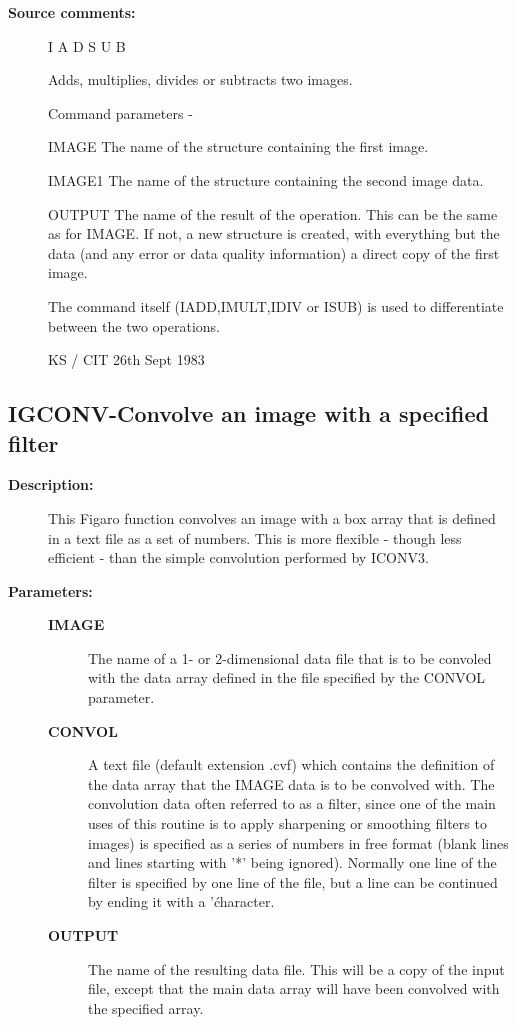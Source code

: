 \begin{description}
\begin{description}
\item [\textbf{Source comments:}]
\begin{terminalv}
 I A D S U B

 Adds, multiplies, divides or subtracts two images.

 Command parameters -

 IMAGE  The name of the structure containing the first image.

 IMAGE1 The name of the structure containing the second
        image data.

 OUTPUT The name of the result of the operation.  This can
        be the same as for IMAGE.  If not, a new structure
        is created, with everything but the data (and any error
        or data quality information) a direct copy of the first
        image.

 The command itself (IADD,IMULT,IDIV or ISUB) is used to
 differentiate between the two operations.

                                  KS / CIT 26th Sept 1983
\end{terminalv}
\end{description}
\subsection{IGCONV-\label{IGCONV}Convolve an image with a specified filter}
\begin{description}

\item [\textbf{Description:}]
 This Figaro function convolves an image with a box array that
 is defined in a text file as a set of numbers.  This is more
 flexible - though less efficient - than the simple convolution
 performed by ICONV3.

\item [\textbf{Parameters:}]
\begin{description}
\item [\textbf{IMAGE}]
 The name of a 1- or 2-dimensional data file that
 is to be convoled with the data array defined
 in the file specified by the CONVOL parameter.
\item [\textbf{CONVOL}]
 A text file (default extension .cvf)
 which contains the definition of the data array that the
 IMAGE data is to be convolved with. The convolution data
 often referred to as a filter, since one of the main uses
 of this routine is to apply sharpening or smoothing filters
 to images) is specified as a series of numbers in free
 format (blank lines and lines starting with '*' being
 ignored). Normally one line of the filter is specified by
 one line of the file, but a line can be continued by
 ending it with a '\' character.
\item [\textbf{OUTPUT}]
 The name of the resulting data file.  This will be
 a copy of the input file, except that the main data
 array will have been convolved with the specified array.
\end{description}


\end{description}
\end{description}
